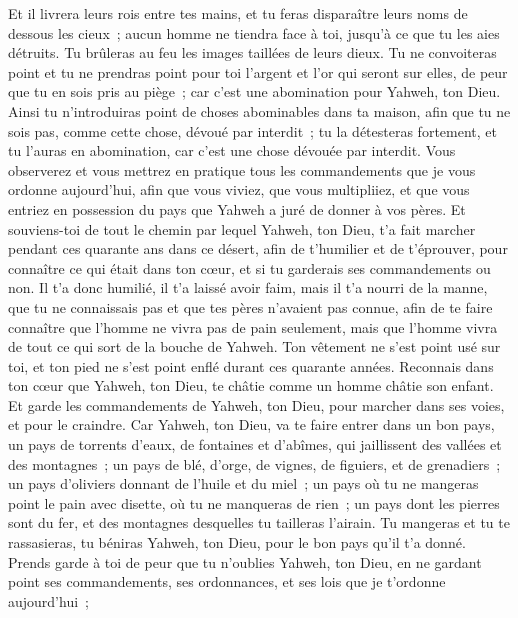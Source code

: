 \begin{multicols}{2}
Et il livrera leurs rois entre tes mains, et tu feras disparaître leurs noms de dessous les cieux~; aucun homme ne tiendra face à toi, jusqu'à ce que tu les aies détruits.
Tu brûleras au feu les images taillées de leurs dieux. Tu ne convoiteras point et tu ne prendras point pour toi l'argent et l'or qui seront sur elles, de peur que tu en sois pris au piège~; car c'est une abomination pour Yahweh, ton Dieu.
Ainsi tu n'introduiras point de choses abominables dans ta maison, afin que tu ne sois pas, comme cette chose, dévoué par interdit~; tu la détesteras fortement, et tu l'auras en abomination, car c'est une chose dévouée par interdit.
\VerseOne{}Vous observerez et vous mettrez en pratique tous les commandements que je vous ordonne aujourd'hui, afin que vous viviez, que vous multipliiez, et que vous entriez en possession du pays que Yahweh a juré de donner à vos pères.
Et souviens-toi de tout le chemin par lequel Yahweh, ton Dieu, t'a fait marcher pendant ces quarante ans dans ce désert, afin de t'humilier et de t'éprouver, pour connaître ce qui était dans ton cœur, et si tu garderais ses commandements ou non.
Il t'a donc humilié, il t'a laissé avoir faim, mais il t'a nourri de la manne, que tu ne connaissais pas et que tes pères n'avaient pas connue, afin de te faire connaître que l'homme ne vivra pas de pain seulement, mais que l'homme vivra de tout ce qui sort de la bouche de Yahweh.
Ton vêtement ne s'est point usé sur toi, et ton pied ne s'est point enflé durant ces quarante années.
Reconnais dans ton cœur que Yahweh, ton Dieu, te châtie comme un homme châtie son enfant.
Et garde les commandements de Yahweh, ton Dieu, pour marcher dans ses voies, et pour le craindre.
Car Yahweh, ton Dieu, va te faire entrer dans un bon pays, un pays de torrents d'eaux, de fontaines et d'abîmes, qui jaillissent des vallées et des montagnes~;
un pays de blé, d'orge, de vignes, de figuiers, et de grenadiers~; un pays d'oliviers donnant de l'huile et du miel~;
un pays où tu ne mangeras point le pain avec disette, où tu ne manqueras de rien~; un pays dont les pierres sont du fer, et des montagnes desquelles tu tailleras l'airain.
Tu mangeras et tu te rassasieras, tu béniras Yahweh, ton Dieu, pour le bon pays qu'il t'a donné.
Prends garde à toi de peur que tu n'oublies Yahweh, ton Dieu, en ne gardant point ses commandements, ses ordonnances, et ses lois que je t'ordonne aujourd'hui~;

\end{multicols}
